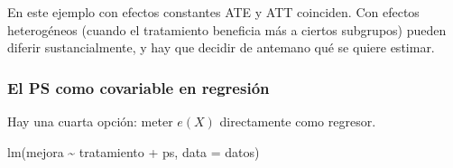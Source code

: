 \documentclass[
  letterpaper,
  DIV=11,
  numbers=noendperiod,
  oneside]{scrreprt}
\newenvironment{Shaded}{\begin{snugshade}}{\end{snugshade}}
\newcommand{\AttributeTok}[1]{\textcolor[rgb]{0.40,0.45,0.13}{#1}}
\newcommand{\CommentTok}[1]{\textcolor[rgb]{0.37,0.37,0.37}{#1}}
\newcommand{\DecValTok}[1]{\textcolor[rgb]{0.68,0.00,0.00}{#1}}
\newcommand{\FunctionTok}[1]{\textcolor[rgb]{0.28,0.35,0.67}{#1}}
\newcommand{\NormalTok}[1]{\textcolor[rgb]{0.00,0.23,0.31}{#1}}
\newcommand{\OtherTok}[1]{\textcolor[rgb]{0.00,0.23,0.31}{#1}}
\newcommand{\SpecialCharTok}[1]{\textcolor[rgb]{0.37,0.37,0.37}{#1}}
\newcommand{\StringTok}[1]{\textcolor[rgb]{0.13,0.47,0.30}{#1}}
\begin{document}
\begin{Shaded}
\end{Shaded}

En este ejemplo con efectos constantes ATE y ATT coinciden. Con efectos
heterogéneos (cuando el tratamiento beneficia más a ciertos subgrupos)
pueden diferir sustancialmente, y hay que decidir de antemano qué se
quiere estimar.

\hypertarget{el-ps-como-covariable-en-regresiuxf3n}{%
\subsubsection{El PS como covariable en
regresión}\label{el-ps-como-covariable-en-regresiuxf3n}}

Hay una cuarta opción: meter \(e(X)\) directamente como regresor.

\begin{Shaded}
\begin{Highlighting}[]
\FunctionTok{lm}\NormalTok{(mejora }\SpecialCharTok{\textasciitilde{}}\NormalTok{ tratamiento }\SpecialCharTok{+}\NormalTok{ ps, }\AttributeTok{data =}\NormalTok{ datos)}
\end{Highlighting}
\end{Shaded}
\end{document}
